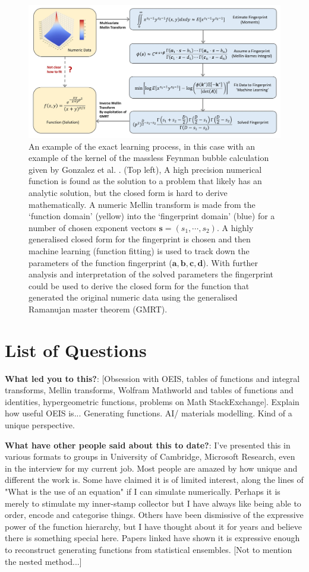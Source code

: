 \documentclass{article}
\begin{document}
\begin{figure}[h]
\includegraphics[scale = 0.323]{Figure1.jpg}
\caption{An example of the exact learning process, in this case with an example of the kernel of the massless Feynman bubble calculation given by Gonzalez et al. \cite{Gonzalez2015}. (Top left), A high precision numerical function is found as the solution to a problem that likely has an analytic solution, but the closed form is hard to derive mathematically. A numeric Mellin transform is made from the `function domain' (yellow) into the `fingerprint domain' (blue) for a number of chosen exponent vectors $\mathbf{s}=(s_1,\cdots,s_2)$. A highly generalised closed form for the fingerprint is chosen and then machine learning (function fitting) is used to track down the parameters of the function fingerprint ($\mathbf{a,b,c,d}$). With further analysis and interpretation of the solved parameters the fingerprint could be used to derive the closed form for the function that generated the original numeric data using the generalised Ramanujan master theorem (GMRT).}
\label{fig:Outline}
\end{figure}

\section{List of Questions}

\textbf{What led you to this?}: [Obsession with OEIS, tables of functions and integral transforms, Mellin transforms, Wolfram Mathworld and tables of functions and identities, hypergeometric functions, problems on Math StackExchange]. Explain how useful OEIS is... Generating functions. AI/ materials modelling. Kind of a unique perspective. 

\textbf{What have other people said about this to date?}: I've presented this in various formats to groups in University of Cambridge, Microsoft Research, even in the interview for my current job. Most people are amazed by how unique and different the work is. Some have claimed it is of limited interest, along the lines of "What is the use of an equation" if I can simulate numerically. Perhaps it is merely to stimulate my inner-stamp collector but I have always like being able to order, encode and categorise things. Others have been dismissive of the expressive power of the function hierarchy, but I have thought about it for years and believe there is something special here. Papers linked have shown it is expressive enough to reconstruct generating functions from statistical ensembles. [Not to mention the nested method...]
\end{document}
